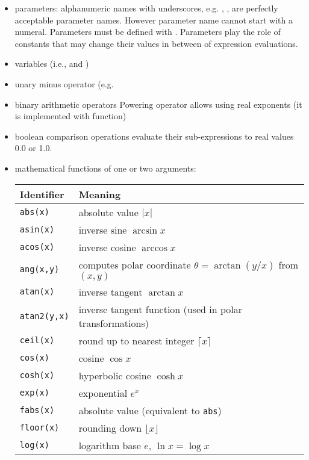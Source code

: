 \begin{itemize}
\item parameters: alphanumeric names with underscores, e.g. ,
,  are perfectly acceptable parameter
names. However parameter name cannot start with a numeral. Parameters must be
defined with . Parameters play the role of
constants that may change their values in between of expression evaluations.

\item variables (i.e.,  and )
\item unary minus operator (e.g. 
\item binary arithmetic operators \inltt{+, -, *, /, \^{}}
   Powering operator allows using real exponents (it is implemented with
    function)
\item boolean comparison operations \inlsh{<, <=, >, >=, ==} evaluate their
sub-expressions to real values 0.0 or 1.0.
\item mathematical functions of one or two arguments:
\begin{center}
\begin{tabular}{ll}
  \toprule
  \textbf{Identifier} & \textbf{Meaning} \\
  \midrule
  \texttt{abs(x)}     & absolute value $|x|$ \\
  \texttt{asin(x)}    & inverse sine $\arcsin x$ \\
  \texttt{acos(x)}    & inverse cosine $\arccos x$ \\
  \texttt{ang(x,y)}   & computes polar coordinate $\theta=\arctan(y/x)$ from $(x,y)$\\
  \texttt{atan(x)}    & inverse tangent $\arctan x$ \\
  \texttt{atan2(y,x)} & inverse tangent function (used in polar transformations) \\
  \texttt{ceil(x)}    & round up to nearest integer $\lceil x\rceil$ \\
  \texttt{cos(x)}     & cosine $\cos x$ \\
  \texttt{cosh(x)}    & hyperbolic cosine $\cosh x$ \\
  \texttt{exp(x)}     & exponential $e^x$ \\
  \texttt{fabs(x)}    & absolute value (equivalent to \texttt{abs}) \\
  \texttt{floor(x)}   & rounding down $\lfloor x\rfloor$ \\
  \texttt{log(x)}     & logarithm base $e$, $\ln x = \log x$ \\

\end{tabular}
\end{center}
\end{itemize}
